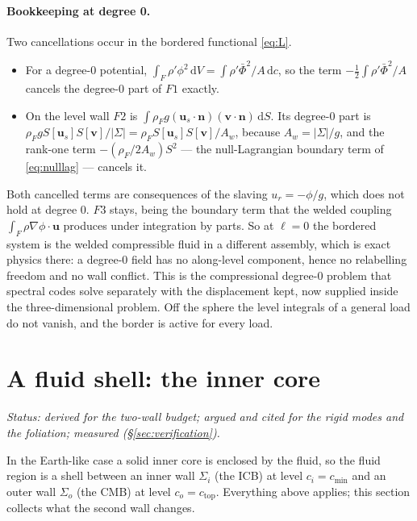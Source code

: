 \documentclass[11pt]{article}
\theoremstyle{definition}
\theoremstyle{remark}
\newcommand{\bu}{\mathbf{u}}
\newcommand{\bv}{\mathbf{v}}
\newcommand{\bn}{\mathbf{n}}
\newcommand{\dS}{\,\mathrm{d}S}
\newcommand{\dV}{\,\mathrm{d}V}
\newcommand{\dc}{\,\mathrm{d}c}
\newcommand{\status}[1]{\noindent\emph{Status: #1}\par\smallskip}
\begin{document}
\paragraph{Bookkeeping at degree 0.} Two cancellations occur in the
bordered functional \eqref{eq:L}.
\begin{itemize}
\item For a degree-0 potential, $\int_F\rho'\phi^2\dV =
  \int\rho'\bar\Phi^2/A\dc$, so the term
  $-\tfrac12\int\rho'\bar\Phi^2/A$ cancels the degree-0 part of $F1$
  exactly.
\item On the level wall $F2$ is $\int\rho_Fg(\bu_s\cdot\bn)(\bv\cdot\bn)
  \dS$. Its degree-0 part is $\rho_FgS[\bu_s]S[\bv]/|\Sigma| =
  \rho_FS[\bu_s]S[\bv]/A_w$, because $A_w = |\Sigma|/g$, and the rank-one
  term $-(\rho_F/2A_w)S^2$ --- the null-Lagrangian boundary term of
  \eqref{eq:nulllag} --- cancels it.
\end{itemize}
Both cancelled terms are consequences of the slaving $u_r = -\phi/g$,
which does not hold at degree $0$. $F3$ stays, being the boundary term
that the welded coupling $\int_F\rho\nabla\phi\cdot\bu$ produces under
integration by parts. So at $\ell = 0$ the bordered system is the
welded compressible fluid in a different assembly, which is exact
physics there: a degree-0 field has no along-level component, hence no
relabelling freedom and no wall conflict. This is the compressional
degree-0 problem that spectral codes solve separately with the
displacement kept, now supplied inside the three-dimensional problem.
Off the sphere the level integrals of a general load do not vanish, and
the border is active for every load.

\section{A fluid shell: the inner core}
\label{sec:shell}

\status{derived for the two-wall budget; argued and cited for the rigid
modes and the foliation; measured (\S\ref{sec:verification}).}

In the Earth-like case a solid inner core is enclosed by the fluid, so
the fluid region is a shell between an inner wall $\Sigma_i$ (the ICB)
at level $c_i = c_{\min}$ and an outer wall $\Sigma_o$ (the CMB) at
level $c_o = c_{\mathrm{top}}$. Everything above applies; this section
collects what the second wall changes.
\end{document}
